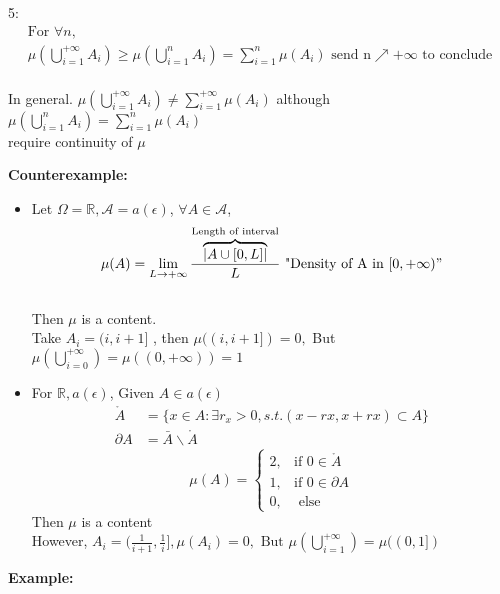 5:\begin{align*}{}{}
\text{For } \forall n,\\
\mu(\bigcup_{i=1}^{+\infty }A_i)\geq \mu(\bigcup_{i=1}^{n}A_i) =\sum_{i=1}^{n}\mu(A_i) \text{ send n}\nearrow +\infty \text{ to conclude}\\
\end{align*}
\begin{remark}[]{}
In general. $ \mu(\bigcup_{i=1}^{+\infty}A_i)\neq \sum_{i=1}^{+\infty}\mu(A_i) $
although $ \mu(\bigcup_{i=1}^{n}A_i)= \sum_{i=1}^{n}\mu(A_i) $
\\require continuity of $\mu $ 
\end{remark}
\textbf{Counterexample:}
\begin{itemize}
\item Let $ \Omega=\mathbb{R},\mathcal{A} =a(\epsilon) $, $ \forall A\in \mathcal{A} $,\\
$$ \mu(A)=\lim_{L\rightarrow+\infty}\frac{\overbrace{|A\cup[0,L]|}^{\text{Length of interval}}}{L} \text{ "Density of A in }[0,+\infty)"$$
\\Then $ \mu $ is a content.
\\Take $ A_i=(i,i+1] $ , then $ \mu((i,i+1])=0, $ But $ \mu(\bigcup_{i=0}^{+\infty})=\mu((0,+\infty))=1$
\item For $ \mathbb{R},a(\epsilon) $, Given $ A\in a(\epsilon) $ 
\begin{align*}{}{}
\mathring{A}&=\{x\in A:\exists r_x>0, s.t. (x-rx,x+rx)\subset A\}\\
\partial{A}&=\bar{A}\backslash\mathring{A}
\end{align*}
$$
\mu(A)=\begin{cases}
        2, & \text{if } 0\in \mathring{A}
        \\1, & \text{if } 0\in \partial{A}\\
        0, & \text{ else }
    \end{cases}
$$
Then $ \mu $ is a content
\\However, $A_i=(\frac{1}{i+1},\frac{1}{i}],\mu(A_i)=0,\text{ But }\mu(\bigcup_{i=1}^{+\infty})=\mu((0,1])$
\end{itemize}
\textbf{Example:}
